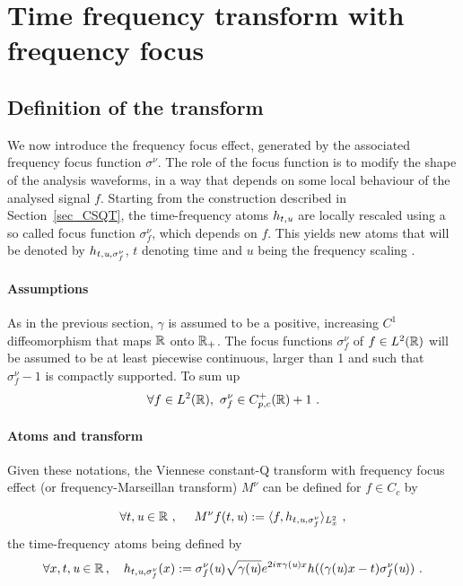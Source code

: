 \section{Time frequency transform with frequency focus}\label{sec_frequency_focus}
\label{sec:freqfocus}

\subsection{Definition of the transform}

We now introduce the frequency focus effect, generated by the associated frequency focus function $\sigma^\nu$. The role of the focus function is to modify the shape of the analysis waveforms, in a way that depends on some local behaviour of the analysed signal $f$. Starting from the construction described in Section~\ref{sec_CSQT}, the time-frequency atoms $h_{t,\textit{u}}$ are locally rescaled using a so called focus function $\sigma^\nu_f$, which depends on $f$. This yields new atoms that will be denoted by $h_{t,\textit{u},\sigma^\nu_f}$, $t$ denoting time and $u$ being the frequency scaling .

\paragraph{Assumptions} As in the previous section, $\gamma$ is assumed to be a positive, increasing $C^1$ diffeomorphism that maps $\mathbb{R}$ onto $\mathbb{R}_+$. The focus functions $\sigma^\nu_f$ of $f\in L^2(\mathbb{R})$ will be assumed to be at least piecewise continuous, larger than 1 and such that $\sigma_f^\nu -1$ is compactly supported. To sum up
\begin{equation}
	\forall f\in L^2(\mathbb{R}), \ \sigma^\nu_f \in C_{p,c}^+(\mathbb{R}) + 1\ .
\end{equation}



\paragraph{Atoms and transform} Given these notations, the Viennese constant-Q transform with frequency focus effect (or frequency-Marseillan transform) $M^\nu$ can be defined for $f\in C_c$ by

\begin{equation}
	\forall t,\textit{u}\in\mathbb{R}\ ,\quad \ M^\nu f(t,\textit{u}) := \langle f , h_{t,\textit{u},\sigma^\nu_f} \rangle_{L^2_x}\ ,
\end{equation}
the time-frequency atoms being defined by
\begin{equation}
	\forall x,t,\u\in\R\, , \quad h_{t,\u,\sigma_f^\nu}(x) := \sigma_f^\nu(\u)\sqrt{\gamma(\u)}e^{2i\pi\gamma(\u)x}h((\gamma(\u)x-t)\sigma_f^\nu(\u))\ .
\end{equation}

